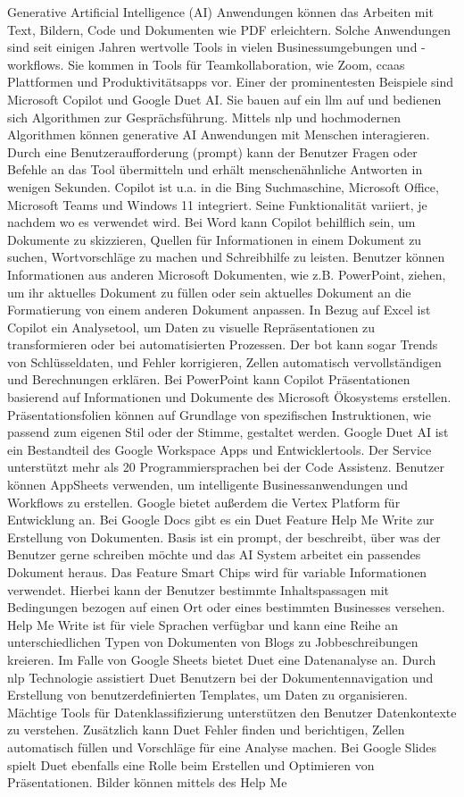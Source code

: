 Generative Artificial Intelligence (AI) Anwendungen können das Arbeiten mit Text, Bildern, Code und Dokumenten wie PDF erleichtern. Solche Anwendungen sind seit einigen Jahren wertvolle Tools in vielen Businessumgebungen und -workflows. Sie kommen in Tools für Teamkollaboration, wie Zoom, \gls{ccaas} Plattformen und Produktivitätsapps vor. Einer der prominentesten Beispiele sind Microsoft Copilot und Google Duet AI. Sie bauen auf ein \gls{llm} auf und bedienen sich Algorithmen zur Gesprächsführung. Mittels \gls{nlp} und hochmodernen Algorithmen können generative AI Anwendungen mit Menschen interagieren. Durch eine Benutzeraufforderung (prompt) kann der Benutzer Fragen oder Befehle an das Tool übermitteln und erhält menschenähnliche Antworten in wenigen Sekunden. Copilot ist u.a. in die Bing Suchmaschine, Microsoft Office, Microsoft Teams und Windows 11 integriert. Seine Funktionalität variiert, je nachdem wo es verwendet wird. Bei Word kann Copilot behilflich sein, um Dokumente zu skizzieren, Quellen für Informationen in einem Dokument zu suchen, Wortvorschläge zu machen und Schreibhilfe zu leisten. Benutzer können Informationen aus anderen Microsoft Dokumenten, wie z.B. PowerPoint, ziehen, um ihr aktuelles Dokument zu füllen oder sein aktuelles Dokument an die Formatierung von einem anderen Dokument anpassen. In Bezug auf Excel ist Copilot ein Analysetool, um Daten zu visuelle Repräsentationen zu transformieren oder bei automatisierten Prozessen. Der bot kann sogar Trends von Schlüsseldaten, und Fehler korrigieren, Zellen automatisch vervollständigen und Berechnungen erklären. Bei PowerPoint kann Copilot Präsentationen basierend auf Informationen und Dokumente des Microsoft Ökosystems erstellen. Präsentationsfolien können auf Grundlage von spezifischen Instruktionen, wie passend zum eigenen Stil oder der Stimme, gestaltet werden. Google Duet AI ist ein Bestandteil des Google Workspace Apps und Entwicklertools. Der Service unterstützt mehr als 20 Programmiersprachen bei der Code Assistenz. Benutzer können AppSheets verwenden, um intelligente Businessanwendungen und Workflows zu erstellen. Google bietet außerdem die Vertex Platform für Entwicklung an. Bei Google Docs gibt es ein Duet Feature Help Me Write zur Erstellung von Dokumenten. Basis ist ein prompt, der beschreibt, über was der Benutzer gerne schreiben möchte und das AI System arbeitet ein passendes Dokument heraus. Das Feature Smart Chips wird für variable Informationen verwendet. Hierbei kann der Benutzer bestimmte Inhaltspassagen mit Bedingungen bezogen auf einen Ort oder eines bestimmten Businesses versehen. Help Me Write ist für viele Sprachen verfügbar und kann eine Reihe an unterschiedlichen Typen von Dokumenten von Blogs zu Jobbeschreibungen kreieren. Im Falle von Google Sheets bietet Duet eine Datenanalyse an. Durch \gls{nlp} Technologie assistiert Duet Benutzern bei der Dokumentennavigation und Erstellung von benutzerdefinierten Templates, um Daten zu organisieren. Mächtige Tools für Datenklassifizierung unterstützen den Benutzer Datenkontexte zu verstehen. Zusätzlich kann Duet Fehler finden und berichtigen, Zellen automatisch füllen und Vorschläge für eine Analyse machen. Bei Google Slides spielt Duet ebenfalls eine Rolle beim Erstellen und Optimieren von Präsentationen. Bilder können mittels des Help Me 